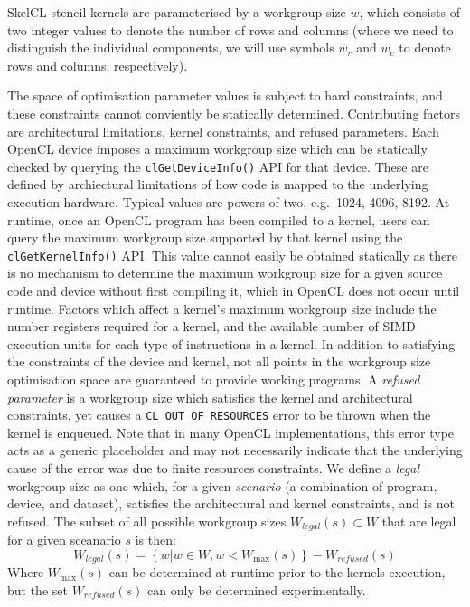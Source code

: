\documentclass[nonatbib,preprint,9pt]{sigplanconf}
\begin{document}
SkelCL stencil kernels are parameterised by a workgroup size $w$,
which consists of two integer values to denote the number of rows and
columns (where we need to distinguish the individual components, we
will use symbols $w_r$ and $w_c$ to denote rows and columns,
respectively).

The space of optimisation parameter values is subject to hard
constraints, and these constraints cannot conviently be statically
determined. Contributing factors are architectural limitations, kernel
constraints, and refused parameters.  Each OpenCL device imposes a
maximum workgroup size which can be statically checked by querying the
\texttt{clGetDeviceInfo()} API for that device. These are defined by
archiectural limitations of how code is mapped to the underlying
execution hardware. Typical values are powers of two, e.g.\ 1024,
4096, 8192. At runtime, once an OpenCL program has been compiled to a
kernel, users can query the maximum workgroup size supported by that
kernel using the \texttt{clGetKernelInfo()} API. This value cannot
easily be obtained statically as there is no mechanism to determine
the maximum workgroup size for a given source code and device without
first compiling it, which in OpenCL does not occur until
runtime. Factors which affect a kernel's maximum workgroup size
include the number registers required for a kernel, and the available
number of SIMD execution units for each type of instructions in a
kernel. In addition to satisfying the constraints of the device and
kernel, not all points in the workgroup size optimisation space are
guaranteed to provide working programs. A \emph{refused parameter} is
a workgroup size which satisfies the kernel and architectural
constraints, yet causes a \texttt{CL\_OUT\_OF\_RESOURCES} error to be
thrown when the kernel is enqueued. Note that in many OpenCL
implementations, this error type acts as a generic placeholder and may
not necessarily indicate that the underlying cause of the error was
due to finite resources constraints. We define a \emph{legal}
workgroup size as one which, for a given \emph{scenario} (a
combination of program, device, and dataset), satisfies the
architectural and kernel constraints, and is not refused. The subset
of all possible workgroup sizes $W_{legal}(s) \subset W$ that are
legal for a given sceanario $s$ is then:
%
\begin{equation}
  W_{legal}(s) = \left\{w | w \in W, w < W_{\max}(s) \right\} - W_{refused}(s)
\end{equation}
%
Where $W_{\max}(s)$ can be determined at runtime prior to the kernels
execution, but the set $W_{refused}(s)$ can only be determined
experimentally.
\end{document}
